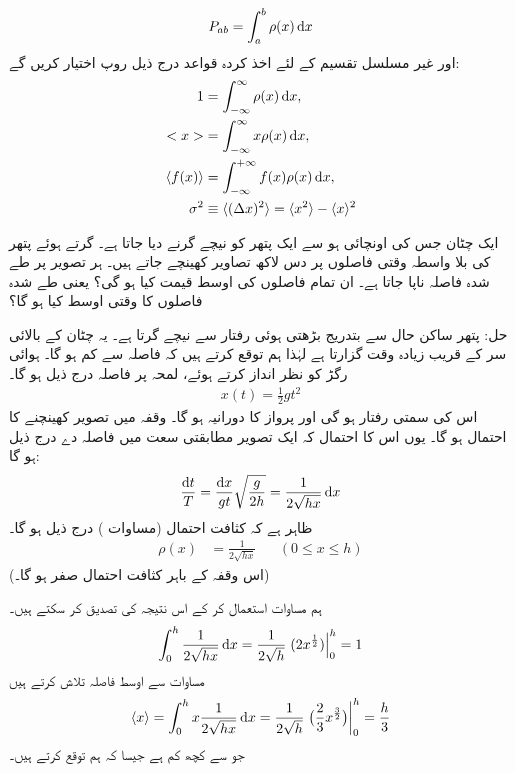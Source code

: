  \begin{align}
 P_{ab}=\int_a^b \rho(x)\dif x 
 \end{align}
اور غیر مسلسل تقسیم کے لئے اخذ کردہ قواعد درج ذیل روپ اختیار کریں گے:
\begin{align}
1&=\int_{-\infty}^{\infty} \rho(x)\dif x,  \label{مساوات_تفاعل_موج_کل_احتمال_اکائی_ہو_گا}\\
<x>& =\int_{-\infty}^{\infty} x\rho(x)\dif x, \label{مساوات_تفاعل_موج_اوسط_تکمل}\\
\langle f(x)\rangle&=\int_{-\infty}^{+\infty} f(x)\rho(x)\dif x,\\
 \sigma^2&\equiv \langle(\Delta x)^2\rangle = \langle x^2\rangle-\langle x\rangle^2 
\end{align}

ایک چٹان جس کی اونچائی  ہو سے ایک پتھر کو نیچے گرنے دیا جاتا ہے۔ گرتے ہوئے  پتھر کی بلا واسطہ وقتی فاصلوں پر دس لاکھ تصاویر کھینچے جاتے ہیں۔ ہر تصویر پر طے شدہ فاصلہ ناپا جاتا ہے۔ ان تمام فاصلوں کی اوسط قیمت کیا ہو گی؟ یعنی طے شدہ فاصلوں کا وقتی اوسط کیا ہو گا؟ 

حل: \quad
پتھر ساکن حال سے بتدریج بڑھتی ہوئی رفتار سے نیچے گرتا ہے۔ یہ چٹان کے  بالائی سر کے قریب زیادہ وقت گزارتا ہے لہٰذا  ہم توقع کرتے ہیں کہ
 فاصلہ  سے کم ہو گا۔ ہوائی رگڑ کو نظر انداز کرتے ہوئے،  لمحہ  پر فاصلہ  درج ذیل ہو گا۔
\begin{align*}
 x(t) = \frac{1}{2} gt^2 
\end{align*}
اس کی سمتی رفتار   ہو گی اور پرواز کا  دورانیہ  ہو گا۔ وقفہ   میں تصویر کھینچنے کا احتمال  ہو گا۔ یوں اس کا احتمال کہ ایک تصویر  مطابقتی سعت  میں فاصلہ دے درج ذیل ہو گا:
 \begin{align}
 \frac{\dif t}{T} = \frac{\dif x}{gt}\sqrt{\frac{g}{2h}} = \frac{1}{2\sqrt{hx}}\dif x
\end{align}   
 ظاہر ہے کہ کثافت احتمال  (مساوات ) درج ذیل ہو گا۔
 \begin{align}
 \rho(x)&=\frac{1}{2\sqrt{hx}} && (0\leq x\leq h)
 \end{align}
 (اس وقفہ کے باہر کثافت  احتمال صفر ہو گا۔) 

ہم مساوات  استعمال کر کے اس نتیجہ کی تصدیق کر سکتے ہیں۔
 \begin{align}
 \int_0^h \frac{1}{2\sqrt{hx}}\dif x = \frac{1}{2\sqrt{h}}\left .(2x^{\frac{1}{2}})\right\vert_0^h =1
 \end{align}
 مساوات  سے اوسط فاصلہ تلاش  کرتے ہیں
 \begin{align}
 \langle x\rangle =\int_0^h x\frac{1}{2\sqrt{hx}}\dif x= \frac{1}{2\sqrt{h}} \left . \big(\frac{2}{3}x^{\frac{3}{2}}\big)\right\vert_0^h = \frac{h}{3}
 \end{align}
 جو     سے کچھ کم ہے  جیسا کہ ہم توقع کرتے ہیں۔


